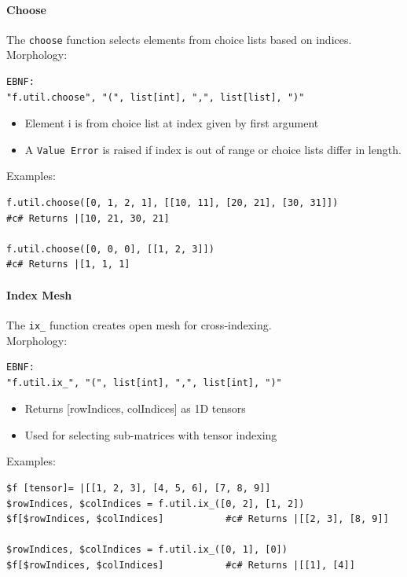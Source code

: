 \paragraph{Choose}
The \texttt{choose} function selects elements from choice lists based on indices.\\
Morphology:
\begin{verbatim}
EBNF:
"f.util.choose", "(", list[int], ",", list[list], ")"
\end{verbatim}
\begin{itemize}
\item Element i is from choice list at index given by first argument
\item A \texttt{Value Error} is raised if index is out of range or choice lists differ in length.
\end{itemize}
Examples:
\begin{verbatim}
f.util.choose([0, 1, 2, 1], [[10, 11], [20, 21], [30, 31]])
#c# Returns |[10, 21, 30, 21]

f.util.choose([0, 0, 0], [[1, 2, 3]])
#c# Returns |[1, 1, 1]
\end{verbatim}

\paragraph{Index Mesh}
The \texttt{ix\_} function creates open mesh for cross-indexing.\\
Morphology:
\begin{verbatim}
EBNF:
"f.util.ix_", "(", list[int], ",", list[int], ")"
\end{verbatim}
\begin{itemize}
\item Returns [rowIndices, colIndices] as 1D tensors
\item Used for selecting sub-matrices with tensor indexing
\end{itemize}
Examples:
\begin{verbatim}
$f [tensor]= |[[1, 2, 3], [4, 5, 6], [7, 8, 9]]
$rowIndices, $colIndices = f.util.ix_([0, 2], [1, 2])
$f[$rowIndices, $colIndices]           #c# Returns |[[2, 3], [8, 9]]

$rowIndices, $colIndices = f.util.ix_([0, 1], [0])
$f[$rowIndices, $colIndices]           #c# Returns |[[1], [4]]
\end{verbatim}

